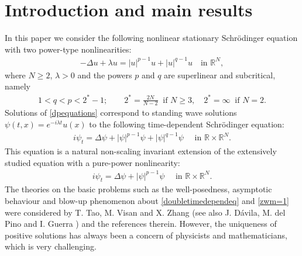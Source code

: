 \documentclass{article}
\theoremstyle{definition} \theoremstyle{remark}
\numberwithin{equation}{section}
\newcommand{\R}{\mathbb{R}}
\newcommand{\la}{\lambda}
\begin{document}
	\newpage
	\tableofcontents

	\bigskip
	
	\section{Introduction and main results} \label{secintroduction}
	In this paper we consider the following  nonlinear stationary Schr\"odinger equation with two
 power-type nonlinearities:
\begin{align} \label{dpequations}
		-\Delta u + \la u = |u|^{p-1}u + |u|^{q-1}u \quad \text{in } \R^N,
	\end{align}
	where $N \ge 2$, $\la > 0$ and the powers $p$ and $q$ are superlinear and subcritical, namely
	\begin{align*}
		1 < q < p < 2^* - 1; \quad\quad 2^* = \frac{2N}{N-2} ~ \text{ if } N \ge 3, \quad 2^* = \infty ~ \text{ if } N = 2.
	\end{align*}
Solutions of \eqref{dpequations} correspond to standing wave solutions $\psi(t,x) = e^{-i\la t}u(x)$ to the following time-dependent Schr\"odinger equation:
\begin{align}\label{doubletimedependeq}
i\psi_t =\Delta \psi  +  |\psi|^{p-1}\psi + |\psi|^{q-1}\psi    \quad \text{ in } \R \times \R^N.
\end{align}
This equation is a natural non-scaling invariant extension of the extensively studied equation with a pure-power nonlinearity:
\begin{align}\label{zwm=1}
i\psi_t = \Delta \psi  +  |\psi|^{p-1}\psi    \quad \text{ in } \R \times \R^N.
\end{align}
The  theories on the basic problems  such as the  well-posedness, asymptotic behaviour and blow-up phenomenon
about \eqref{doubletimedependeq} and \eqref{zwm=1} were  considered  by  T. Tao, M. Visan and X. Zhang \cite{tao} (see also  J. D\'avila, M. del Pino and I. Guerra \cite{DPG}) and the references therein. However, the uniqueness of positive solutions has always been a concern of physicists and mathematicians, which is very challenging.

\vskip0.12in
\end{document}
